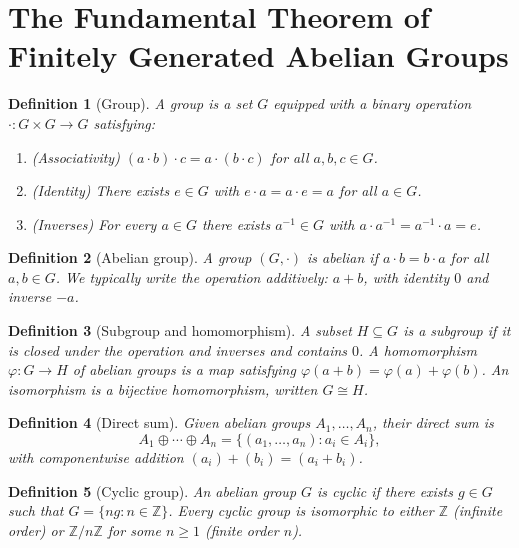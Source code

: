\documentclass{article}
\newtheorem{definition}{Definition}
\begin{document}
\section*{The Fundamental Theorem of Finitely Generated Abelian Groups}

\begin{definition}[Group]
A \emph{group} is a set $G$ equipped with a binary operation $\cdot : G \times G \to G$ satisfying:
\begin{enumerate}
    \item (Associativity) $(a \cdot b) \cdot c = a \cdot (b \cdot c)$ for all $a,b,c \in G$.
    \item (Identity) There exists $e \in G$ with $e \cdot a = a \cdot e = a$ for all $a \in G$.
    \item (Inverses) For every $a \in G$ there exists $a^{-1} \in G$ with $a \cdot a^{-1} = a^{-1} \cdot a = e$.
\end{enumerate}
\end{definition}

\begin{definition}[Abelian group]
A group $(G, \cdot)$ is \emph{abelian} if $a \cdot b = b \cdot a$ for all $a, b \in G$. We typically write the operation additively: $a + b$, with identity $0$ and inverse $-a$.
\end{definition}

\begin{definition}[Subgroup and homomorphism]
A subset $H \subseteq G$ is a \emph{subgroup} if it is closed under the operation and inverses and contains $0$. A \emph{homomorphism} $\varphi : G \to H$ of abelian groups is a map satisfying $\varphi(a+b) = \varphi(a) + \varphi(b)$. An \emph{isomorphism} is a bijective homomorphism, written $G \cong H$.
\end{definition}

\begin{definition}[Direct sum]
Given abelian groups $A_1, \dots, A_n$, their \emph{direct sum} is
\[
    A_1 \oplus \cdots \oplus A_n 
    = \{ (a_1, \dots, a_n) : a_i \in A_i \},
\]
with componentwise addition $(a_i) + (b_i) = (a_i + b_i)$.
\end{definition}

\begin{definition}[Cyclic group]
An abelian group $G$ is \emph{cyclic} if there exists $g \in G$ such that $G = \{ ng : n \in \mathbb{Z} \}$. Every cyclic group is isomorphic to either $\mathbb{Z}$ (infinite order) or $\mathbb{Z}/n\mathbb{Z}$ for some $n \ge 1$ (finite order $n$).
\end{definition}
\end{document}
